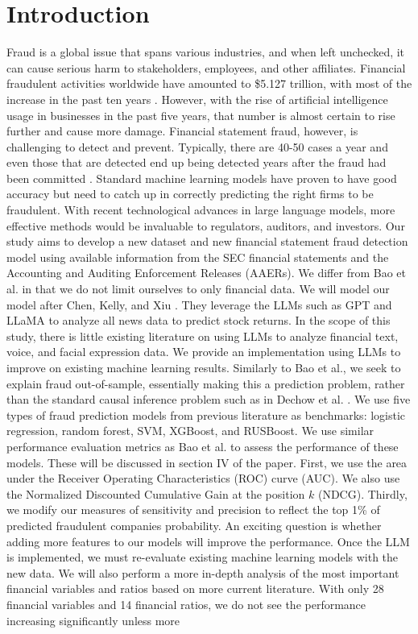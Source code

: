 \documentclass[conference]{IEEEtran}
\begin{document}
\section{Introduction}
Fraud is a global issue that spans various industries, and when left unchecked, it can cause serious harm to stakeholders, employees, and other affiliates. Financial fraudulent activities worldwide have amounted to \$5.127 trillion, with most of the increase in the past ten years \cite{b5}. However, with the rise of artificial intelligence usage in businesses in the past five years, that number is almost certain to rise further and cause more damage. Financial statement fraud, however, is challenging to detect and prevent. Typically, there are 40-50 cases a year and even those that are detected end up being detected years after the fraud had been committed \cite{b4}. Standard machine learning models have proven to have good accuracy but need to catch up in correctly predicting the right firms to be fraudulent. With recent technological advances in large language models, more effective methods would be invaluable to regulators, auditors, and investors. \newline\indent Our study aims to develop a new dataset and new financial statement fraud detection model using available information from the SEC financial statements and the Accounting and Auditing Enforcement Releases (AAERs). We differ from Bao et al. in that we do not limit ourselves to only financial data. We will model our model after Chen, Kelly, and Xiu \cite{b2}. They leverage the LLMs such as GPT and LLaMA to analyze all news data to predict stock returns. In the scope of this study, there is little existing literature on using LLMs to analyze financial text, voice, and facial expression data. We provide an implementation using LLMs to improve on existing machine learning results. Similarly to Bao et al., we seek to explain fraud out-of-sample, essentially making this a prediction problem, rather than the standard causal inference problem such as in Dechow et al. \cite{b3}. \newline\indent We use five types of fraud prediction models from previous literature as benchmarks: logistic regression, random forest, SVM, XGBoost, and RUSBoost. We use similar performance evaluation metrics as Bao et al. \cite{b7} to assess the performance of these models. These will be discussed in section IV of the paper. First, we use the area under the Receiver Operating Characteristics (ROC) curve (AUC). We also use the Normalized Discounted Cumulative Gain at the position $k$ (NDCG\@k). Thirdly, we modify our measures of sensitivity and precision to reflect the top 1\% of predicted fraudulent companies probability. \newline\indent An exciting question is whether adding more features to our models will improve the performance. Once the LLM is implemented, we must re-evaluate existing machine learning models with the new data. We will also perform a more in-depth analysis of the most important financial variables and ratios based on more current literature. With only 28 financial variables and 14 financial ratios, we do not see the performance increasing significantly unless more 
\end{document}
